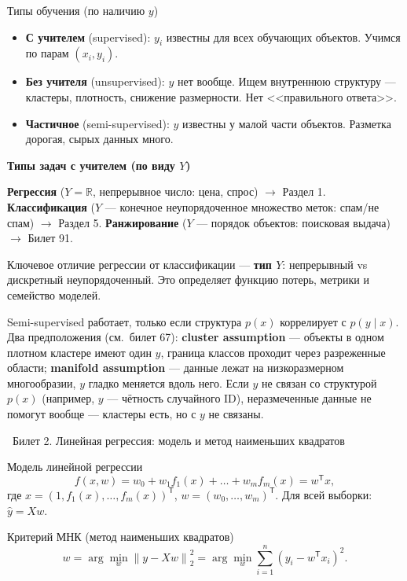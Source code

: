 \documentclass[12pt, a4paper]{article}
\newcommand{\bilet}[2]{%
  \vspace{10pt}%
  \noindent\colorbox{qcolor}{\parbox{\dimexpr\linewidth-2\fboxsep\relax}{%
    \color{white}\large\bfseries\strut\ Билет #1. #2%
  }}%
  \nopagebreak\vspace{5pt}\par\nopagebreak%
}
\newcommand{\qsub}[1]{%
  \vspace{5pt}%
  {\bfseries\color{defblue} #1}%
  \par\vspace{2pt}%
}
\newcommand{\R}{\mathbb{R}}
\newcommand{\tr}{^{\mathsf{T}}}
\newcommand{\norm}[1]{\left\lVert #1 \right\rVert}
\newcommand{\wh}[1]{\widehat{#1}}
\begin{document}
\begin{defbox}{Типы обучения (по наличию $y$)}
\begin{itemize}
  \item \textbf{С учителем} (supervised): $y_i$ известны для всех обучающих объектов. Учимся по парам $(x_i, y_i)$.
  \item \textbf{Без учителя} (unsupervised): $y$ нет вообще. Ищем внутреннюю структуру --- кластеры, плотность, снижение размерности. Нет <<правильного ответа>>.
  \item \textbf{Частичное} (semi-supervised): $y$ известны у малой части объектов. Разметка дорогая, сырых данных много.
\end{itemize}
\end{defbox}

\qsub{Типы задач с учителем (по виду $Y$)}
\textbf{Регрессия} ($Y = \R$, непрерывное число: цена, спрос) $\to$ Раздел 1. \textbf{Классификация} ($Y$ --- конечное неупорядоченное множество меток: спам/не спам) $\to$ Раздел 5. \textbf{Ранжирование} ($Y$ --- порядок объектов: поисковая выдача) $\to$ Билет 91.

Ключевое отличие регрессии от классификации --- \textbf{тип $Y$}: непрерывный vs дискретный неупорядоченный. Это определяет функцию потерь, метрики и семейство моделей.

\begin{fishkabox}
Semi-supervised работает, только если структура $p(x)$ коррелирует с $p(y\mid x)$. Два предположения (см.\ билет 67):
\textbf{cluster assumption} --- объекты в одном плотном кластере имеют один $y$, граница классов проходит через разреженные области;
\textbf{manifold assumption} --- данные лежат на низкоразмерном многообразии, $y$ гладко меняется вдоль него.
Если $y$ не связан со структурой $p(x)$ (например, $y$ --- чётность случайного ID), неразмеченные данные не помогут вообще --- кластеры есть, но с $y$ не связаны.
\end{fishkabox}

\bilet{2}{Линейная регрессия: модель и метод наименьших квадратов}

\begin{defbox}{Модель линейной регрессии}
\[
  f(x, w) = w_0 + w_1 f_1(x) + \dots + w_m f_m(x) = w\tr x,
\]
где $x = (1, f_1(x), \ldots, f_m(x))\tr$, $w = (w_0, \ldots, w_m)\tr$. Для всей выборки: $\wh y = Xw$.
\end{defbox}

\begin{defbox}{Критерий МНК (метод наименьших квадратов)}
\[
  w = \arg\min_w \norm{y - Xw}_2^2 = \arg\min_w \sum_{i=1}^n (y_i - w\tr x_i)^2.
\]
\end{defbox}
\end{document}
